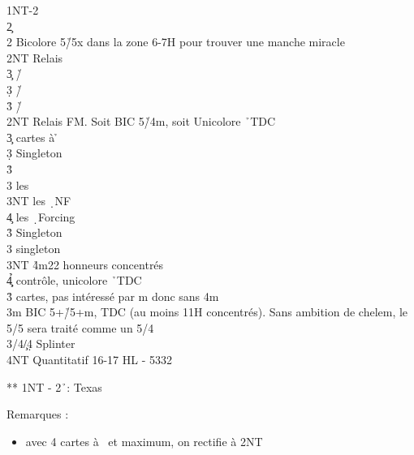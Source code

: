 \documentclass[a4paper]{article}
\begin{document}
\begin{bidtable}
1NT-2\d\\
2\c\+\\
2\s \> Bicolore 5\h /5x dans la zone 6-7H pour trouver une manche miracle\+\\
2NT \> Relais\+\\
3\c \> \h /\c \\
3\d \> \h /\d \\
3\h \> \h /\s \-\-\\
2NT \> Relais FM. Soit BIC 5\h /4m, soit Unicolore \h\ TDC\+\\
3\c {} cartes à \h \+\\
3\d \> Singleton \s \+\\
3\h\+\\
3\s \> les \c \\
3NT \> les \d\ NF\\
4\c \> les \d\ Forcing\-\-\\
3\h \> Singleton \c \\
3\s \> singleton \d \\
3NT \h 4m22 honneurs concentrés\\
4\c\d\h \> contrôle, unicolore \h\ TDC\-\\
3\h {} cartes, pas intéressé par m donc sans 4m\-\\
3m \> BIC 5+\h /5+m, TDC (au moins 11H concentrés). Sans ambition de chelem, le 5/5 sera traité comme un 5/4\\
3\s/4\c/4\d \> Splinter\\
4NT \> Quantitatif 16-17 HL - 5332\-
\end{bidtable}

** 1NT - 2\h\ : Texas \s 

Remarques :

\begin{itemize}
\item avec 4 cartes à \s\ et maximum, on rectifie à 2NT

\end{itemize}
\end{document}
